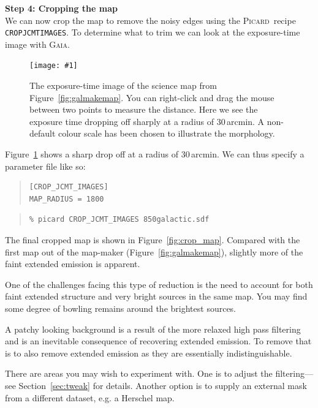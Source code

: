 \documentclass[twoside,11pt]{article}
\newcommand{\htmladdnormallink}[2]{#1}
\newcommand{\htmladdimg}[1]{}
\newcommand{\htmlref}[2]{#1}
\newcommand{\latexhtml}[2]{#1}
\newcommand{\xref}[3]{#1}
\renewcommand{\_}{\texttt{\symbol{95}}}
\newenvironment{myquote}{\begin{quote}\begin{small}}{\end{small}\end{quote}}
\newcommand{\gaia}{\xref{\textsc{Gaia}}{sun214}{}}
\newcommand{\picard}{\xref{\textsc{Picard}}{sun265}{}}
\newcommand{\drrecipe}[1]{\texttt{#1}}
\newcommand{\myfig}[6]{
  \begin{figure}#2
    \centering\texttt{[image: \#1]}
    \typeout{#1 inserted on page \arabic{page}}
    \caption[#5]{\label{#4}\small #6}
  \end{figure}
}
\newcommand{\myfig}[6]{
    \label{#4} \htmladdimg{#1.png}\\
    \\
    Figure: #6\\
  }
\newcommand{\cref}[3]{\latexhtml{#1~\ref{#2}}{\htmlref{#3}{#2}}}
\begin{document}
\textbf{Step 4: Cropping the map}
\vspace{0.2cm}\\
We can now crop the map to remove the noisy edges using the \picard\ recipe
\drrecipe{CROP\_JCMT\_IMAGES}. To determine what to trim we can look
at the exposure-time image with \gaia.

\myfig{sc21_gal_exptime}{[th!]}{width=0.7\linewidth}{fig:exptime}{
  Galactic example: exposure time map}{
  The exposure-time image of the science map from \cref{Figure}{fig:galmakemap}{
  our example map}. You can right-click and drag the mouse
  between two points to measure the distance. Here we see the exposure
  time dropping off sharply at a radius of 30\,arcmin. A non-default
  colour scale has been chosen to illustrate the morphology.
}

\cref{Figure}{fig:exptime}{The exposure-time image} shows a sharp drop
off at a radius of 30\,arcmin. We can thus specify a parameter file like so:
\begin{center}
\begin{myquote}
\begin{verbatim}
[CROP_JCMT_IMAGES]
MAP_RADIUS = 1800
\end{verbatim}
\end{myquote}
\end{center}

\begin{myquote}
\begin{verbatim}
% picard CROP_JCMT_IMAGES 850galactic.sdf
\end{verbatim}
\end{myquote}
The final cropped map is shown in \cref{Figure}{fig:crop_map}{this plot}. Compared
with the first map out of the map-maker
(\cref{Figure}{fig:galmakemap}{first map}),
slightly more of the faint extended emission is apparent.

One of the challenges facing this type of reduction is the need to
account for both faint extended structure and very bright sources in
the same map. You may find some degree of bowling remains around the
brightest sources.

A patchy looking background is a result of the more relaxed high pass
filtering and is an inevitable consequence of recovering extended
emission. To remove that is to also remove extended emission as they
are essentially indistinguishable.

There are areas you may wish to experiment with. One is to adjust the
filtering---see \cref{Section}{sec:tweak}{Tweaking the configuration
file} for details. Another option is to supply an external mask from
a different dataset, e.g. a
\htmladdnormallink{Herschel}{http://herschel.esac.esa.int/} map.
\end{document}
